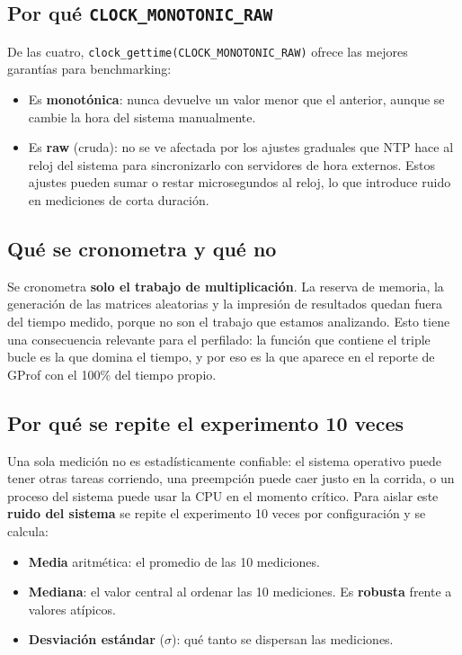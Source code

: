 \subsection{Por qué \texttt{CLOCK\_MONOTONIC\_RAW}}

De las cuatro, \texttt{clock\_gettime(CLOCK\_MONOTONIC\_RAW)} ofrece las mejores garantías para benchmarking:

\begin{itemize}
    \item Es \textbf{monotónica}: nunca devuelve un valor menor que el anterior, aunque se cambie la hora del sistema manualmente.
    \item Es \textbf{raw} (cruda): no se ve afectada por los ajustes graduales que NTP hace al reloj del sistema para sincronizarlo con servidores de hora externos. Estos ajustes pueden sumar o restar microsegundos al reloj, lo que introduce ruido en mediciones de corta duración.
\end{itemize}

\subsection{Qué se cronometra y qué no}

Se cronometra \textbf{solo el trabajo de multiplicación}. La reserva de memoria, la generación de las matrices aleatorias y la impresión de resultados quedan fuera del tiempo medido, porque no son el trabajo que estamos analizando. Esto tiene una consecuencia relevante para el perfilado: la función que contiene el triple bucle es la que domina el tiempo, y por eso es la que aparece en el reporte de GProf con el 100\% del tiempo propio.

\subsection{Por qué se repite el experimento 10 veces}

Una sola medición no es estadísticamente confiable: el sistema operativo puede tener otras tareas corriendo, una preempción puede caer justo en la corrida, o un proceso del sistema puede usar la CPU en el momento crítico. Para aislar este \textbf{ruido del sistema} se repite el experimento 10 veces por configuración y se calcula:

\begin{itemize}
    \item \textbf{Media} aritmética: el promedio de las 10 mediciones.
    \item \textbf{Mediana}: el valor central al ordenar las 10 mediciones. Es \textbf{robusta} frente a valores atípicos.
    \item \textbf{Desviación estándar} ($\sigma$): qué tanto se dispersan las mediciones.
\end{itemize}

